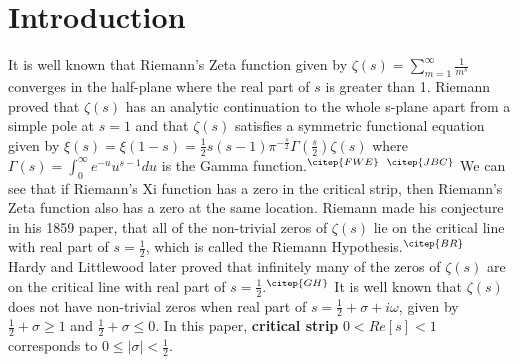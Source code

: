 \documentclass[11pt]{elsarticle}
\begin{document}








\section{\label{sec:level2} \textbf{Introduction} \protect\\  \lowercase{} }

It is well known that Riemann's Zeta function given by $\zeta(s) = \sum\limits_{m=1}^{\infty} \frac{1}{m^{s}}$ converges in the half-plane where the real part of $s$ is greater than 1. Riemann proved that  $\zeta(s)$  has an analytic continuation to the whole s-plane apart from a simple pole at $s = 1$ and that $\zeta(s)$  satisfies a symmetric functional equation given by $\xi(s) = \xi(1-s) =  \frac{1}{2} s (s-1) \pi^{-\frac{s}{2}} \Gamma(\frac{s}{2}) \zeta(s) $ where $\Gamma(s) = \int_{0}^{\infty} e^{-u} u^{s-1} du$ is the Gamma function.$^{\citep{FWE}}$ $^{\citep{JBC}}$ We can see that if Riemann's Xi function has a zero in the critical strip, then Riemann's Zeta function also has a zero at the same location. Riemann made his conjecture in his 1859 paper, that all of the non-trivial zeros of $\zeta(s)$ lie on the critical line with real part of $s = \frac{1}{2}$, which is called the Riemann Hypothesis.$^{\citep{BR}}$ \\

Hardy and Littlewood later proved that infinitely many of the zeros of $\zeta(s)$ are on the critical line with real part of $s=\frac{1}{2}$.$^{\citep{GH}}$ It is well known that $\zeta(s)$ does not have non-trivial zeros when real part of $s = \frac{1}{2} + \sigma + i \omega$, given by $\frac{1}{2} + \sigma \geq 1$ and $\frac{1}{2} + \sigma \leq 0$. In this paper, \textbf{critical strip} $0 < Re[s] < 1 $ corresponds to $0 \leq |\sigma| < \frac{1}{2}$.\\
\end{document}
